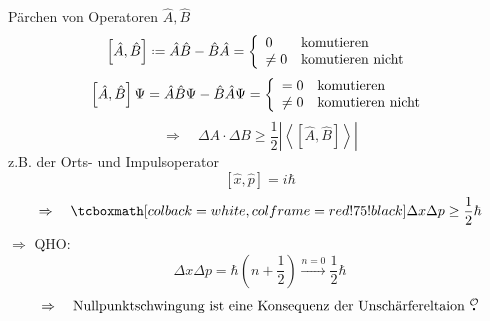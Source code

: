 Pärchen von Operatoren $ \hat{A}, \hat{B} $
\begin{equation*}
\left[\hat{A}, \hat{B}\right] \defeq \hat{A} \hat{B} - \hat{B} \hat{A} = \casess{0}{\tx{komutieren}}{\neq 0}{\tx{komutieren nicht}}
\end{equation*}
\begin{equation*}
\left[\hat{A}, \hat{B}\right] \Psi = \hat{A} \hat{B} \Psi - \hat{B} \hat{A} \Psi = \left\{ \begin{array}{ll} {= 0} & {\textrm{komutieren}} \\ {\neq 0} & {\textrm{komutieren nicht}} \end{array} \right.
\end{equation*}
\begin{equation*}
\Rightarrow \quad \Delta A \cdot \Delta B \ge \frac{1}{2} \left|\left\langle \left[\hat{A}, \hat{B}\right] \right\rangle\right|
\end{equation*}
z.B. der Orts- und Impulsoperator
\begin{equation*}
\left[\hat{x}, \hat{p}\right] = i \hbar
\end{equation*}
\begin{equation*}
\Rightarrow \quad \rmbox{\Delta x \Delta p \ge \frac{1}{2} \hbar}
\end{equation*}
$ \Rightarrow $ QHO:
\begin{equation*}
\Delta x \Delta p = \hbar \left(n + \frac{1}{2}\right) \overset{n = 0}{\longrightarrow} \frac{1}{2} \hbar
\end{equation*}
\begin{equation*}
\Rightarrow \quad \tx{Nullpunktschwingung ist eine Konsequenz der Unschärfereltaion \mau}
\end{equation*}


